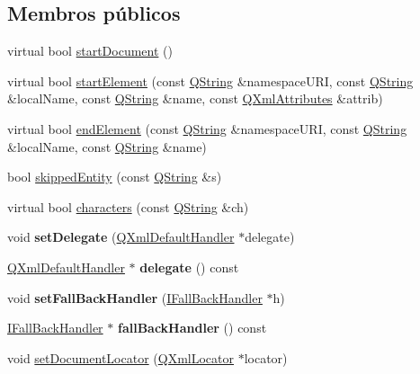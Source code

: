 \subsection*{Membros públicos}
\begin{DoxyCompactItemize}
\item 
virtual bool \hyperlink{class_base_handler_a2b02c429e179690d0785020713a6bd06}{start\-Document} ()
\item 
virtual bool \hyperlink{class_base_handler_af861c355ac62b4b24365ddfd226eccd7}{start\-Element} (const \hyperlink{class_q_string}{Q\-String} \&namespace\-U\-R\-I, const \hyperlink{class_q_string}{Q\-String} \&local\-Name, const \hyperlink{class_q_string}{Q\-String} \&name, const \hyperlink{class_q_xml_attributes}{Q\-Xml\-Attributes} \&attrib)
\item 
virtual bool \hyperlink{class_base_handler_a05536b83184a79912d80d986a3d60bb5}{end\-Element} (const \hyperlink{class_q_string}{Q\-String} \&namespace\-U\-R\-I, const \hyperlink{class_q_string}{Q\-String} \&local\-Name, const \hyperlink{class_q_string}{Q\-String} \&name)
\item 
bool \hyperlink{class_base_handler_a4f1b47ade1d77cb973e68738af8c422f}{skipped\-Entity} (const \hyperlink{class_q_string}{Q\-String} \&s)
\item 
virtual bool \hyperlink{class_base_handler_ae9e90bf53548ca210db99147e85d050d}{characters} (const \hyperlink{class_q_string}{Q\-String} \&ch)
\item 
\hypertarget{class_base_handler_adbcf6fe487094399d9aebc69e50c30cd}{void {\bfseries set\-Delegate} (\hyperlink{class_q_xml_default_handler}{Q\-Xml\-Default\-Handler} $\ast$delegate)}\label{class_base_handler_adbcf6fe487094399d9aebc69e50c30cd}

\item 
\hypertarget{class_base_handler_a17f9ea6414cb2dddbe01e2c3eafcff48}{\hyperlink{class_q_xml_default_handler}{Q\-Xml\-Default\-Handler} $\ast$ {\bfseries delegate} () const }\label{class_base_handler_a17f9ea6414cb2dddbe01e2c3eafcff48}

\item 
\hypertarget{class_base_handler_ab84c609b1c02f398ba297648bced9c9a}{void {\bfseries set\-Fall\-Back\-Handler} (\hyperlink{class_i_fall_back_handler}{I\-Fall\-Back\-Handler} $\ast$h)}\label{class_base_handler_ab84c609b1c02f398ba297648bced9c9a}

\item 
\hypertarget{class_base_handler_ac6ebe4f0d9d87b30868a4cc727b39365}{\hyperlink{class_i_fall_back_handler}{I\-Fall\-Back\-Handler} $\ast$ {\bfseries fall\-Back\-Handler} () const }\label{class_base_handler_ac6ebe4f0d9d87b30868a4cc727b39365}

\item 
void \hyperlink{class_base_handler_a6ea335308d212e2244af77edaff21d6a}{set\-Document\-Locator} (\hyperlink{class_q_xml_locator}{Q\-Xml\-Locator} $\ast$locator)
\end{DoxyCompactItemize}
